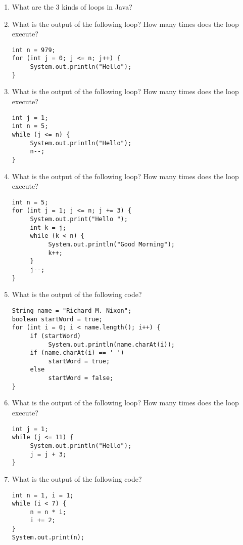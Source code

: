 \begin{enumerate}

\item What are the 3 kinds of loops in Java?

\item What is the output of the following loop? How many times does the loop execute?
\begin{lstlisting}
int n = 979;
for (int j = 0; j <= n; j++) {
     System.out.println("Hello");
}
\end{lstlisting}

\item What is the output of the following loop? How many times does the loop execute?
\begin{lstlisting}
int j = 1;
int n = 5;
while (j <= n) {
     System.out.println("Hello");
     n--;
}
\end{lstlisting}

\item What is the output of the following loop? How many times does the loop execute?
\begin{lstlisting}
int n = 5;
for (int j = 1; j <= n; j += 3) {
     System.out.print("Hello ");
     int k = j;
     while (k < n) {
          System.out.println("Good Morning");
          k++;
     }
     j--;
}
\end{lstlisting}

\item What is the output of the following code?
\begin{lstlisting}
String name = "Richard M. Nixon";
boolean startWord = true;
for (int i = 0; i < name.length(); i++) {
     if (startWord)
          System.out.println(name.charAt(i));
     if (name.charAt(i) == ' ')
          startWord = true;
     else
          startWord = false;
}
\end{lstlisting}

\item What is the output of the following loop? How many times does the loop execute?
\begin{lstlisting}
int j = 1;
while (j <= 11) {
     System.out.println("Hello");
     j = j + 3;
}
\end{lstlisting}

\item What is the output of the following code?
\begin{lstlisting}
int n = 1, i = 1;
while (i < 7) {
     n = n * i;
     i += 2;
}
System.out.print(n);
\end{lstlisting}

\end{enumerate}


